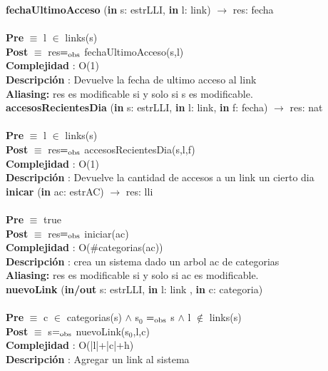 	\textbf{fechaUltimoAcceso} (\textbf{in} s: estrLLI, \textbf{in} l: link) $\longrightarrow$ res: fecha\\\\
	\textbf{Pre} $\equiv$ {l $\in$ links(s)}\\
	\textbf{Post} $\equiv$ {res$=_{\mathrm{obs}}$ fechaUltimoAcceso(s,l)}\\
	\textbf{Complejidad} : O(1)\\
	\textbf{Descripci\'{o}n} : Devuelve la fecha de ultimo acceso al link\\
	\textbf{Aliasing: }{res es modificable si y solo si s es modificable.}\\
	
	\textbf{accesosRecientesDia} (\textbf{in} s: estrLLI, \textbf{in} l: link, \textbf{in} f: fecha) $\longrightarrow$ res: nat\\\\
	\textbf{Pre} $\equiv$ {l $\in$ links(s)}\\
	\textbf{Post} $\equiv$ {res$=_{\mathrm{obs}}$ accesosRecientesDia(s,l,f)}\\
	\textbf{Complejidad} : O(1)\\
	\textbf{Descripci\'{o}n} : Devuelve la cantidad de accesos a un link un cierto dia\\
	
	\textbf{inicar} (\textbf{in} ac: estrAC) $\longrightarrow$ res: lli\\\\
	\textbf{Pre} $\equiv$ {true}\\
	\textbf{Post} $\equiv$ {res$=_{\mathrm{obs}}$ iniciar(ac)}\\
	\textbf{Complejidad} : O($\#$categorias(ac))\\
	\textbf{Descripci\'{o}n} : crea un sistema dado un arbol ac de categorias\\
	\textbf{Aliasing: }{res es modificable si y solo si ac es modificable.}\\
	
	\textbf{nuevoLink} (\textbf{in/out} s: estrLLI, \textbf{in} l: link , \textbf{in} c: categoria) \\\\
	\textbf{Pre} $\equiv$ {c $\in$ categorias(s) $\wedge$ s${_0}$ $=_{\mathrm{obs}}$ s $\wedge$ l $\notin$ links(s)}\\
	\textbf{Post} $\equiv$ {s$=_{\mathrm{obs}}$ nuevoLink(s${_0}$,l,c)}\\
	\textbf{Complejidad} : O(|l|+|c|+h)\\
	\textbf{Descripci\'{o}n} : Agregar un link al sistema\\
	
